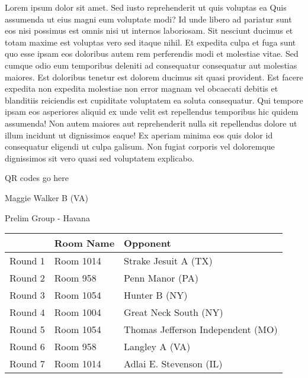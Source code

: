 \documentclass{article}%
\begin{document}
\vspace*{8pt}%
\linebreak%
\newline%
\newline%
Lorem ipsum dolor sit amet. Sed iusto reprehenderit ut quis voluptas ea Quis assumenda ut eius magni eum voluptate modi? Id unde libero ad pariatur sunt eos nisi possimus est omnis nisi ut internos laboriosam. Sit nesciunt ducimus et totam maxime est voluptas vero sed itaque nihil. Et expedita culpa et fuga sunt quo esse ipsam eos doloribus autem rem perferendis modi et molestiae vitae.\newline%
\newline%
Sed cumque odio eum temporibus deleniti ad consequatur consequatur aut molestias maiores. Est doloribus tenetur est dolorem ducimus sit quasi provident. Est facere expedita non expedita molestiae non error magnam vel obcaecati debitis et blanditiis reiciendis est cupiditate voluptatem ea soluta consequatur. Qui tempore ipsam eos asperiores aliquid ex unde velit est repellendus temporibus hic quidem assumenda!\newline%
\newline%
Non autem maiores aut reprehenderit nulla sit repellendus dolore ut illum incidunt ut dignissimos eaque! Ex aperiam minima eos quis dolor id consequatur eligendi ut culpa galisum. Non fugiat corporis vel doloremque dignissimos sit vero quasi sed voluptatem explicabo.\newline%
\newline%
%
\vspace*{30pt}%
\begin{center}%
\begin{Huge}%
QR codes go here%
\end{Huge}%
\end{center}%
\newpage%
%
\begin{center}%
\begin{Huge}%
Maggie Walker B (VA)%
\end{Huge}%
\vspace*{8pt}%
\linebreak%
\begin{Large}%
Prelim Group {-} Havana%
\end{Large}%
\end{center}%
\begin{tabularx}{\textwidth}{|c|Y|Y|}%
\hline%
&Room Name&Opponent\\%
\hline%
Round 1&Room 1014&Strake Jesuit A (TX)\\%
Round 2&Room 958&Penn Manor (PA)\\%
Round 3&Room 1054&Hunter B (NY)\\%
Round 4&Room 1004&Great Neck South (NY)\\%
Round 5&Room 1054&Thomas Jefferson Independent (MO)\\%
Round 6&Room 958&Langley A (VA)\\%
Round 7&Room 1014&Adlai E. Stevenson (IL)\\%
\hline%
\end{tabularx}%
\end{document}
